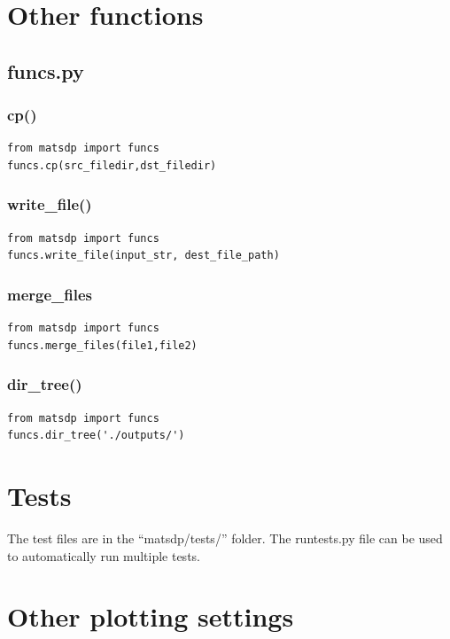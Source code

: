 \documentclass[12pt]{book}
\begin{document}
\chapter{Other functions}
\section{funcs.py}

\subsection{cp()}

\begin{lstlisting}
from matsdp import funcs
funcs.cp(src_filedir,dst_filedir)
\end{lstlisting}

\subsection{write\_file()}

\begin{lstlisting}
from matsdp import funcs
funcs.write_file(input_str, dest_file_path)
\end{lstlisting}

\subsection{merge\_files}
\begin{lstlisting}
from matsdp import funcs
funcs.merge_files(file1,file2)
\end{lstlisting}

\subsection{dir\_tree()}

\begin{lstlisting}
from matsdp import funcs
funcs.dir_tree('./outputs/')
\end{lstlisting}

\chapter{Tests}
The test files are in the ``matsdp/tests/'' folder. The runtests.py file can be used to automatically run multiple tests.


\newpage
\appendix

\chapter{Other plotting settings}
\end{document}
